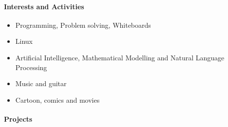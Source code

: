 \documentclass[letterpaper,10pt,oneside]{article}
\begin{document}
\paragraph{\large{Interests and Activities}}
\begin{itemize}
    \itemsep-0.2em 
    \item Programming, Problem solving, Whiteboards
    \item Linux
    \item Artificial Intelligence, Mathematical Modelling and Natural Language Processing
    \item Music and guitar
    \item Cartoon, comics and movies
\end{itemize}

\newpage

\paragraph{\large{Projects}\\\\}
\end{document}
